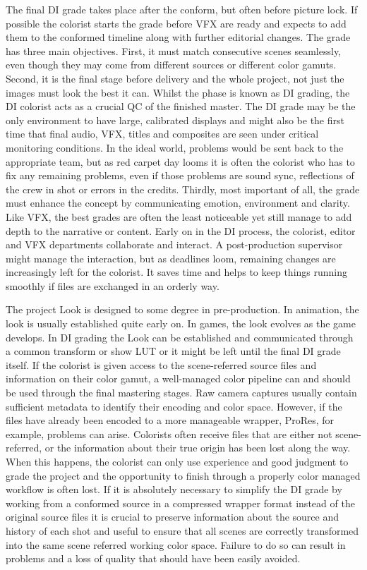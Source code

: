 The final DI grade takes place after the conform, but often before picture lock. If possible the colorist starts the grade before VFX are ready and expects to add them to the conformed timeline along with further editorial changes. The grade has three main objectives. First, it must match consecutive scenes seamlessly, even though they may come from different sources or different color gamuts. Second, it is the final stage before delivery and the whole project, not just the images must look the best it can. Whilst the phase is known as DI grading, the DI colorist acts as a crucial QC of the finished master. The DI grade may be the only environment to have large, calibrated displays and might also be the first time that final audio, VFX, titles and composites are seen under critical monitoring conditions. In the ideal world, problems would be sent back to the appropriate team, but as red carpet day looms it is often the colorist who has to fix any remaining problems, even if those problems are sound sync, reflections of the crew in shot or errors in the credits. Thirdly, most important of all, the grade must enhance the concept by communicating emotion, environment and clarity. Like VFX, the best grades are often the least noticeable yet still manage to add depth to the narrative or content. Early on in the DI process, the colorist, editor and VFX departments collaborate and interact. A post-production supervisor might manage the interaction, but as deadlines loom, remaining changes are increasingly left for the colorist. It saves time and helps to keep things running smoothly if files are exchanged in an orderly way.

The project Look is designed to some degree in pre-production. In animation, the look is usually established quite early on. In games, the look evolves as the game develops. In DI grading the Look can be established and communicated through a common transform or show LUT or it might be left until the final DI grade itself. If the colorist is given access to the scene-referred source files and information on their color gamut, a well-managed color pipeline can and should be used through the final mastering stages. Raw camera captures usually contain sufficient metadata to identify their encoding and color space. However, if the files have already been encoded to a more manageable wrapper, ProRes, for example, problems can arise. Colorists often receive files that are either not scene-referred, or the information about their true origin has been lost along the way. When this happens, the colorist can only use experience and good judgment to grade the project and the opportunity to finish through a properly color managed workflow is often lost. If it is absolutely necessary to simplify the DI grade by working from a conformed source in a compressed wrapper format instead of the original source files it is crucial to preserve information about the source and history of  each shot and useful to ensure that all scenes are correctly transformed into the same scene referred working color space. Failure to do so can result in problems and a loss of quality that should have been easily avoided.

